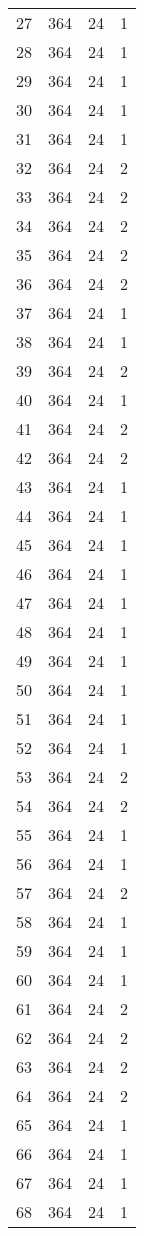 \begin{longtable}[!]{c|ccc}
	27	& 364	& 24	& 1	\\
	28	& 364	& 24	& 1	\\
	29	& 364	& 24	& 1	\\
	30	& 364	& 24	& 1	\\
	31	& 364	& 24	& 1	\\
	32	& 364	& 24	& 2	\\
	33	& 364	& 24	& 2	\\
	34	& 364	& 24	& 2	\\
	35	& 364	& 24	& 2	\\
	36	& 364	& 24	& 2	\\
	37	& 364	& 24	& 1	\\
	38	& 364	& 24	& 1	\\
	39	& 364	& 24	& 2	\\
	40	& 364	& 24	& 1	\\
	41	& 364	& 24	& 2	\\
	42	& 364	& 24	& 2	\\
	43	& 364	& 24	& 1	\\
	44	& 364	& 24	& 1	\\
	45	& 364	& 24	& 1	\\
	46	& 364	& 24	& 1	\\
	47	& 364	& 24	& 1	\\
	48	& 364	& 24	& 1	\\
	49	& 364	& 24	& 1	\\
	50	& 364	& 24	& 1	\\
	51	& 364	& 24	& 1	\\
	52	& 364	& 24	& 1	\\
	53	& 364	& 24	& 2	\\
	54	& 364	& 24	& 2	\\
	55	& 364	& 24	& 1	\\
	56	& 364	& 24	& 1	\\
	57	& 364	& 24	& 2	\\
	58	& 364	& 24	& 1	\\
	59	& 364	& 24	& 1	\\
	60	& 364	& 24	& 1	\\
	61	& 364	& 24	& 2	\\
	62	& 364	& 24	& 2	\\
	63	& 364	& 24	& 2	\\
	64	& 364	& 24	& 2	\\
	65	& 364	& 24	& 1	\\
	66	& 364	& 24	& 1	\\
	67	& 364	& 24	& 1	\\
	68	& 364	& 24	& 1	\\

\end{longtable}
